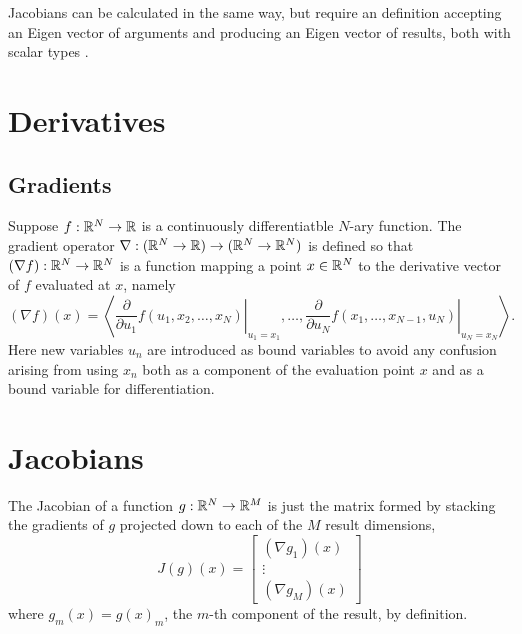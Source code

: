 \documentclass[10pt]{article}
\begin{document}
Jacobians can be calculated in the same way, but require an
 definition accepting an Eigen vector of arguments
and producing an Eigen vector of results, both with scalar types
.

\clearpage
\appendix

\section{Derivatives}

\subsection{Gradients}

Suppose $f : \mathbb{R}^N \rightarrow \mathbb{R}$ is a continuously
differentiatble $N$-ary function.  The gradient operator
$\nabla:(\mathbb{R}^N \rightarrow \mathbb{R})\rightarrow (\mathbb{R}^N \rightarrow
\mathbb{R}^N)$ is defined so that $(\nabla f):\mathbb{R}^N \rightarrow
\mathbb{R}^N$ is a function mapping a point $x \in \mathbb{R}^N$ to the
derivative vector of $f$ evaluated at $x$, namely
%
\[
(\nabla f)(x) 
= 
\left\langle 
  \left. \frac{\partial}{\partial u_1} f(u_1,x_2,\ldots,x_N)
  \right|_{u_1 = x_1},
  \ldots,
  \left. \frac{\partial}{\partial u_N}
    f(x_1,\ldots,x_{N-1},u_N)\right|_{u_N = x_N}
\right\rangle.
\]
%
Here new variables $u_n$ are introduced as bound variables to
avoid any confusion arising from using $x_n$ both as a component of
the evaluation point $x$ and as a bound variable for differentiation.

\section{Jacobians}

The Jacobian of a function $g : \mathbb{R}^N \rightarrow \mathbb{R}^M$ is just
the matrix formed by stacking the gradients of $g$ projected down to
each of the $M$ result dimensions,
%
\[
J(g)(x) = 
\left[
\begin{array}{c}
(\nabla g_1)(x)
\\[2pt]
\vdots
\\[2pt]
(\nabla g_M)(x)
\end{array}
\right]
\]
%
where $g_m(x) = g(x)_m$, the $m$-th component of the result, by definition.

\clearpage
\nocite{Hogan:2014}
\nocite{Neal:2003}



\end{document}
